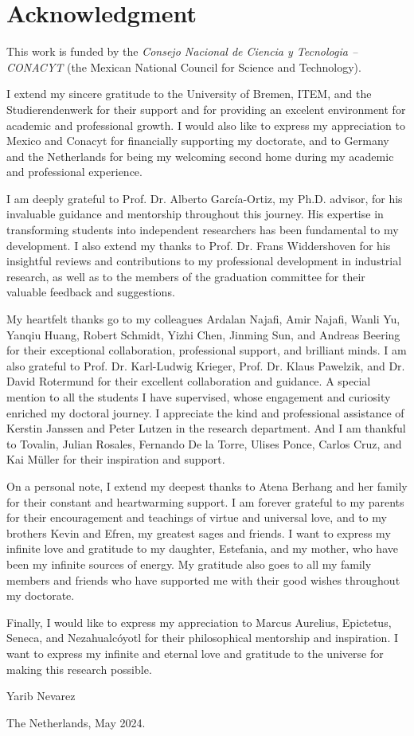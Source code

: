 \chapter*{Acknowledgment}
\thispagestyle{empty}
This work is funded by the \textit{Consejo Nacional de Ciencia y Tecnologia -- CONACYT} (the Mexican National Council for Science and Technology).

I extend my sincere gratitude to the University of Bremen, ITEM, and the Studierendenwerk for their support and for providing an excelent environment for academic and professional growth. I would also like to express my appreciation to Mexico and Conacyt for financially supporting my doctorate, and to Germany and the Netherlands for being my welcoming second home during my academic and professional experience.

I am deeply grateful to Prof. Dr. Alberto Garc\'ia-Ortiz, my Ph.D. advisor, for his invaluable guidance and mentorship throughout this journey. His expertise in transforming students into independent researchers has been fundamental to my development. I also extend my thanks to Prof. Dr. Frans Widdershoven for his insightful reviews and contributions to my professional development in industrial research, as well as to the members of the graduation committee for their valuable feedback and suggestions.

My heartfelt thanks go to my colleagues Ardalan Najafi, Amir Najafi, Wanli Yu, Yanqiu Huang, Robert Schmidt, Yizhi Chen, Jinming Sun, and Andreas Beering for their exceptional collaboration, professional support, and brilliant minds. I am also grateful to Prof. Dr. Karl-Ludwig Krieger, Prof. Dr. Klaus Pawelzik, and Dr. David Rotermund for their excellent collaboration and guidance. A special mention to all the students I have supervised, whose engagement and curiosity enriched my doctoral journey. I appreciate the kind and professional assistance of Kerstin Janssen and Peter Lutzen in the research department. And I am thankful to Tovalin, Julian Rosales, Fernando De la Torre, Ulises Ponce, Carlos Cruz, and Kai M\"uller for their inspiration and support.

On a personal note, I extend my deepest thanks to Atena Berhang and her family for their constant and heartwarming support. I am forever grateful to my parents for their encouragement and teachings of virtue and universal love, and to my brothers Kevin and Efren, my greatest sages and friends. I want to express my infinite love and gratitude to my daughter, Estefania, and my mother, who have been my infinite sources of energy. My gratitude also goes to all my family members and friends who have supported me with their good wishes throughout my doctorate. 

Finally, I would like to express my appreciation to Marcus Aurelius, Epictetus, Seneca, and Nezahualc\'oyotl for their philosophical mentorship and inspiration. I want to express my infinite and eternal love and gratitude to the universe for making this research possible.

Yarib Nevarez

The Netherlands, May 2024.

